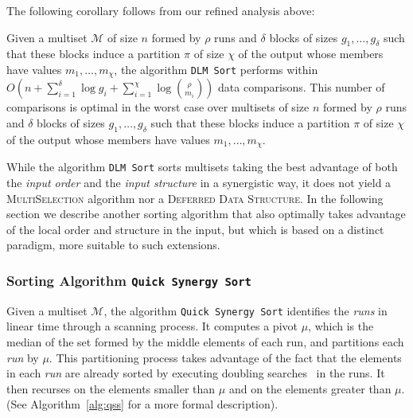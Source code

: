 \begin{INUTILE}
The following corollary follows from
our refined analysis above:

  \begin{corollary}
    Given a multiset $\mathcal{M}$ of size $n$ formed by $\rho$ runs
    and $\delta$ blocks of sizes $g_1, \dots, g_{\delta}$ such that
    these blocks induce a partition $\pi$ of size $\chi$ of the output
    whose members have values $m_1, \dots, m_{\chi}$, the algorithm
    {\tt{DLM Sort}} performs within
    $O(n + \sum^{\delta}_{i=1}\log g_i +
    \sum^{\chi}_{i=1}\log{\binom{\rho}{m_i}})$ data comparisons. This
    number of comparisons is optimal in the worst case over multisets
    of size $n$ formed by $\rho$ runs and $\delta$ blocks of sizes
    $g_1, \dots, g_{\delta}$ such that these blocks induce a partition
    $\pi$ of size $\chi$ of the output whose members have values
    $m_1, \dots, m_{\chi}$.
  \end{corollary}
\end{INUTILE}

While the algorithm \texttt{DLM Sort} sorts multisets taking the best
advantage of both the \emph{input order} and the \emph{input
  structure} in a synergistic way, it does not yield a
\textsc{MultiSelection} algorithm nor a \textsc{Deferred Data
  Structure}. In the following section we
describe another sorting algorithm that also optimally takes advantage
of the local order and structure in the input, but which is based on a
distinct paradigm, more suitable to such extensions.

\subsubsection{Sorting Algorithm {\texttt{Quick Synergy
      Sort}}}
\label{sec:qss}

Given a multiset $\mathcal{M}$, the algorithm \texttt{Quick Synergy
  Sort} identifies the \emph{runs} in linear time through a scanning
process. It computes a pivot $\mu$, which is the median of the set
formed by the middle elements of each run, and partitions each
\emph{run} by $\mu$. This partitioning process takes advantage of the
fact that the elements in each \emph{run} are already sorted by
executing doubling
searches~\cite{1976-IPL-AnAlmostOptimalAlgorithmForUnboundedSearching-BentleyYao}
in the runs. It then recurses on the elements smaller than $\mu$ and
on the elements greater than $\mu$. (See Algorithm~\ref{alg:qss} for a
more formal description).

